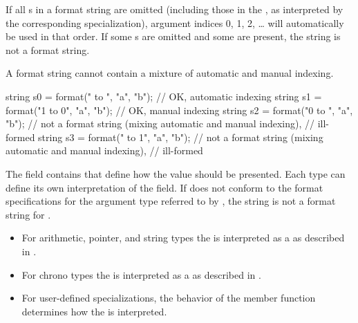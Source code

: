 \pnum
\begin{example}
\begin{codeblock}
string s = format("{0}-{{", 8);         // value of  is 
\end{codeblock}
\end{example}

\pnum
If all s in a format string are omitted
(including those in the ,
as interpreted by the corresponding  specialization),
argument indices 0, 1, 2, \ldots{} will automatically be used in that order.
If some s are omitted and some are present,
the string is not a format string.
\begin{note}
A format string cannot contain a
mixture of automatic and manual indexing.
\end{note}
\begin{example}
\begin{codeblock}
string s0 = format("{} to {}",   "a", "b"); // OK, automatic indexing
string s1 = format("{1} to {0}", "a", "b"); // OK, manual indexing
string s2 = format("{0} to {}",  "a", "b"); // not a format string (mixing automatic and manual indexing),
                                            // ill-formed
string s3 = format("{} to {1}",  "a", "b"); // not a format string (mixing automatic and manual indexing),
                                            // ill-formed
\end{codeblock}
\end{example}

\pnum
The  field contains
that define how the value should be presented.
Each type can define its own
interpretation of the  field.
If  does not conform
to the format specifications for
the argument type referred to by ,
the string is not a format string for .
\begin{example}
\begin{itemize}
\item
For arithmetic, pointer, and string types
the 
is interpreted as a 
as described in .
\item
For chrono types
the 
is interpreted as a 
as described in .
\item
For user-defined  specializations,
the behavior of the  member function
determines how the 
is interpreted.
\end{itemize}
\end{example}

